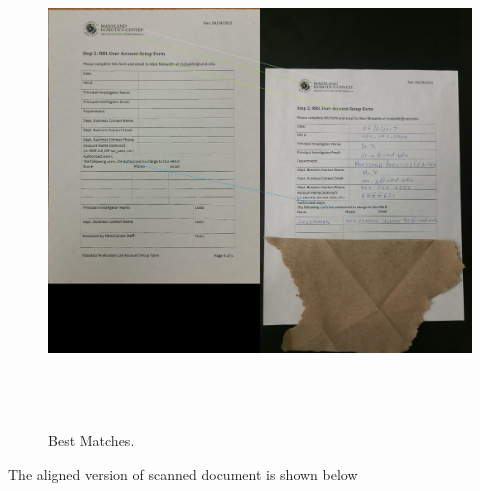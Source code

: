 \begin{figure}[th]
	\centering
	\includegraphics[height=13cm ]{Figures/best_four_matches_ransac}
	\caption[Best Matches]{Best Matches.}
	\label{fig:BestMatches}
\end{figure}
\pagebreak

 The aligned version of scanned document is shown below \\ \\ 
 
